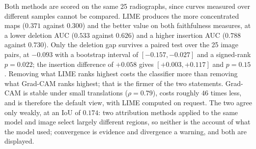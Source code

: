 \documentclass[conference]{IEEEtran}
\begin{document}
Both methods are scored on the same 25 radiographs, since curves measured
over different samples cannot be compared. LIME
produces the more concentrated maps ($0.371$ against $0.300$) and the better
value on both faithfulness measures, at a lower deletion AUC ($0.533$
against $0.626$) and a higher insertion AUC ($0.788$ against $0.730$). Only
the deletion gap survives a paired test over the 25 image pairs, at $-0.093$
with a bootstrap interval of $[-0.157, -0.027]$ and a signed-rank $p=0.022$;
the insertion difference of $+0.058$ gives $[+0.003, +0.117]$ and $p=0.15$.
Removing what LIME ranks highest costs the classifier more than removing
what Grad-CAM ranks highest; that is the firmer of the two statements. Grad-CAM is stable under small translations
($\rho=0.79$), costs roughly $46$ times less, and is therefore the default
view, with LIME computed on request. The two agree only weakly, at an IoU of
$0.174$: two attribution methods applied to the same model and image select
largely different regions, so neither is the account of what the model used;
convergence is evidence and divergence a warning, and both are displayed.
\end{document}
